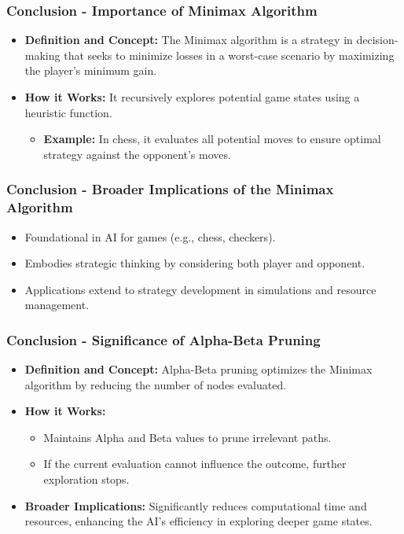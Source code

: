 \documentclass[aspectratio=169]{beamer}
\begin{document}
\begin{frame}[fragile]
    \frametitle{Conclusion - Importance of Minimax Algorithm}
    \begin{itemize}
        \item \textbf{Definition and Concept:} 
        The Minimax algorithm is a strategy in decision-making that seeks to minimize losses in a worst-case scenario by maximizing the player's minimum gain.
        
        \item \textbf{How it Works:} 
        It recursively explores potential game states using a heuristic function.
        \begin{itemize}
            \item \textbf{Example:} In chess, it evaluates all potential moves to ensure optimal strategy against the opponent's moves.
        \end{itemize}
    \end{itemize}
\end{frame}

\begin{frame}[fragile]
    \frametitle{Conclusion - Broader Implications of the Minimax Algorithm}
    \begin{itemize}
        \item Foundational in AI for games (e.g., chess, checkers).
        \item Embodies strategic thinking by considering both player and opponent.
        \item Applications extend to strategy development in simulations and resource management.
    \end{itemize}
\end{frame}

\begin{frame}[fragile]
    \frametitle{Conclusion - Significance of Alpha-Beta Pruning}
    \begin{itemize}
        \item \textbf{Definition and Concept:}
        Alpha-Beta pruning optimizes the Minimax algorithm by reducing the number of nodes evaluated.
        
        \item \textbf{How it Works:}
        \begin{itemize}
            \item Maintains Alpha and Beta values to prune irrelevant paths.
            \item If the current evaluation cannot influence the outcome, further exploration stops.
        \end{itemize}
        
        \item \textbf{Broader Implications:}
        Significantly reduces computational time and resources, enhancing the AI's efficiency in exploring deeper game states.
    \end{itemize}  
\end{frame}
\end{document}
